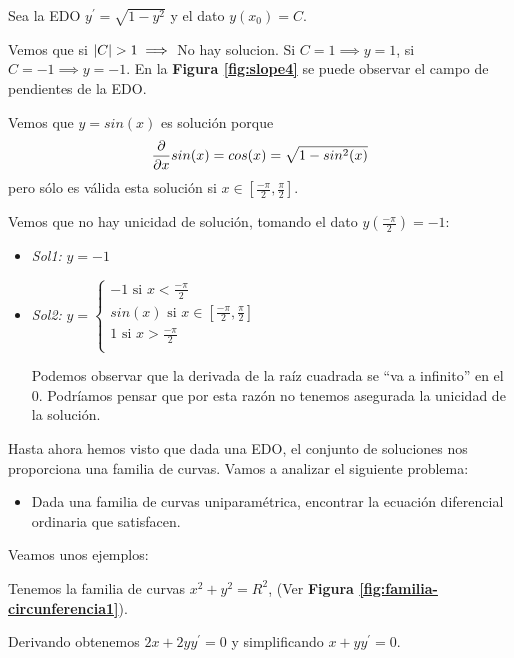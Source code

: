 \begin{example}
Sea la EDO $y^\prime = \sqrt{1-y^2}$ y el dato $y(x_0)=C$.

Vemos que si $|C| > 1 \implies$ No hay solucion. Si $C = 1 \implies y = 1$, si $C = -1 \implies y = -1$. En la \textbf{Figura \ref{fig:slope4}} se puede observar el campo de pendientes de la EDO.

Vemos que $y=sin(x)$ es solución porque
$$\frac{\partial}{\partial x}sin(x)=cos(x)=\sqrt{1-sin^2(x)}$$
pero sólo es válida esta solución si $x\in[\frac{-\pi}{2}, \frac{\pi}{2}]$.

Vemos que no hay unicidad de solución, tomando el dato $y(\frac{-\pi}{2}) = -1:$
\begin{itemize}
\item \textit{Sol1: } $y=-1$
\item \textit{Sol2: } 
$
  y=
  \left\lbrace
  \begin{array}{l}
     -1 \text{ si } x \lt \frac{-\pi}{2} \\
     sin(x) \text{ si } x\in[\frac{-\pi}{2}, \frac{\pi}{2}] \\
     1 \text{ si } x \gt \frac{-\pi}{2} \\
  \end{array}
  \right.
$

Podemos observar que la derivada de la raíz cuadrada se ``va a infinito'' en el $0$. Podríamos pensar que por esta razón no tenemos asegurada la unicidad de la solución.
\end{itemize}
\end{example}

Hasta ahora hemos visto que dada una EDO, el conjunto de soluciones nos proporciona una familia de curvas.
Vamos a analizar el siguiente problema:
\begin{itemize}
\item Dada una familia de curvas uniparamétrica, encontrar la ecuación diferencial ordinaria que satisfacen.
\end{itemize}

Veamos unos ejemplos:

\begin{example}
Tenemos la familia de curvas $x^2+y^2=R^2$, (Ver \textbf{Figura \ref{fig:familia-circunferencia1}}).

Derivando obtenemos $2x+2yy^\prime = 0$ y simplificando $x+yy^\prime = 0$.
\end{example}

